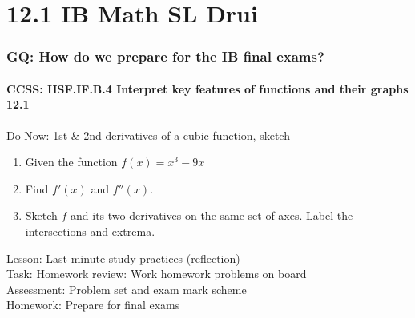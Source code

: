 \documentclass{beamer}
\begin{document}
  \section{12.1 IB Math SL Drui}
  \frame
  {
    \frametitle{GQ: How do we prepare for the IB final exams?}
    \framesubtitle{CCSS: HSF.IF.B.4 Interpret key features of functions and their graphs \qquad \alert{12.1}}

    \begin{block}{Do Now: 1st \& 2nd derivatives of a cubic function, sketch}
      \begin{enumerate}
      \item Given the function $f(x)=x^3-9x$
      \item Find $f'(x)$ and $f''(x)$.
      \item Sketch $f$ and its two derivatives on the same set of axes. Label the intersections and extrema.
      \end{enumerate}
   \end{block}
    Lesson: Last minute study practices (reflection) \\[5pt]
    Task: Homework review: Work homework problems on board\\%
    Assessment: Problem set and exam mark scheme\\%
    Homework: Prepare for final exams
  }
\end{document}
